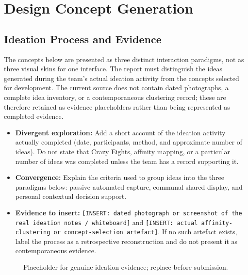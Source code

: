 \documentclass[12pt, a4paper]{article}
\begin{document}
\section{Design Concept Generation}

\subsection{Ideation Process and Evidence}
The concepts below are presented as three distinct interaction paradigms, not as three visual skins for one interface. The report must distinguish the ideas generated during the team’s actual ideation activity from the concepts selected for development. The current source does not contain dated photographs, a complete idea inventory, or a contemporaneous clustering record; these are therefore retained as evidence placeholders rather than being represented as completed evidence.

\begin{itemize}
    \item \textbf{Divergent exploration:} Add a short account of the ideation activity actually completed (date, participants, method, and approximate number of ideas). Do not state that Crazy Eights, affinity mapping, or a particular number of ideas was completed unless the team has a record supporting it.
    \item \textbf{Convergence:} Explain the criteria used to group ideas into the three paradigms below: passive automated capture, communal shared display, and personal contextual decision support.
    \item \textbf{Evidence to insert:} \texttt{[INSERT: dated photograph or screenshot of the real ideation notes / whiteboard]} and \texttt{[INSERT: actual affinity-clustering or concept-selection artefact]}. If no such artefact exists, label the process as a retrospective reconstruction and do not present it as contemporaneous evidence.
\end{itemize}

\begin{figure}[H]
    \centering
    \caption{Placeholder for genuine ideation evidence; replace before submission.}
    \label{fig:ideation-evidence}
\end{figure}
\end{document}
